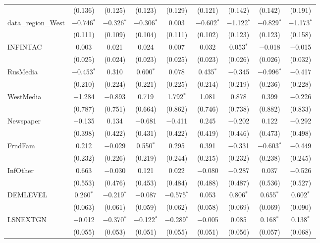 \begin{table}[!htbp]
\begin{tabular}{@{\extracolsep{1pt}}lcccccccc}
  & (0.136) & (0.125) & (0.123) & (0.129) & (0.121) & (0.142) & (0.142) & (0.191) \\ 
  data\_region\_West & $-$0.746$^{*}$ & $-$0.326$^{*}$ & $-$0.306$^{*}$ & 0.003 & $-$0.602$^{*}$ & $-$1.122$^{*}$ & $-$0.829$^{*}$ & $-$1.173$^{*}$ \\ 
  & (0.111) & (0.109) & (0.104) & (0.111) & (0.102) & (0.123) & (0.123) & (0.158) \\ 
  INFINTAC & 0.003 & 0.021 & 0.024 & 0.007 & 0.032 & 0.053$^{*}$ & $-$0.018 & $-$0.015 \\ 
  & (0.025) & (0.024) & (0.023) & (0.025) & (0.023) & (0.026) & (0.026) & (0.032) \\ 
  RusMedia & $-$0.453$^{*}$ & 0.310 & 0.600$^{*}$ & 0.078 & 0.435$^{*}$ & $-$0.345 & $-$0.996$^{*}$ & $-$0.417 \\ 
  & (0.210) & (0.224) & (0.221) & (0.225) & (0.214) & (0.219) & (0.236) & (0.228) \\ 
  WestMedia & $-$1.284 & $-$0.893 & 0.719 & 1.792$^{*}$ & 1.081 & 0.878 & 0.399 & $-$0.226 \\ 
  & (0.787) & (0.751) & (0.664) & (0.862) & (0.746) & (0.738) & (0.882) & (0.833) \\ 
  Newspaper & $-$0.135 & 0.134 & $-$0.681 & $-$0.411 & 0.245 & $-$0.202 & 0.122 & $-$0.292 \\ 
  & (0.398) & (0.422) & (0.431) & (0.422) & (0.419) & (0.446) & (0.473) & (0.498) \\ 
  FrndFam & 0.212 & $-$0.029 & 0.550$^{*}$ & 0.295 & 0.391 & $-$0.331 & $-$0.603$^{*}$ & $-$0.449 \\ 
  & (0.232) & (0.226) & (0.219) & (0.244) & (0.215) & (0.232) & (0.238) & (0.245) \\ 
  InfOther & 0.663 & $-$0.030 & 0.121 & 0.022 & $-$0.080 & $-$0.287 & 0.037 & $-$0.526 \\ 
  & (0.553) & (0.476) & (0.453) & (0.484) & (0.488) & (0.487) & (0.536) & (0.527) \\ 
  DEMLEVEL & 0.260$^{*}$ & $-$0.219$^{*}$ & $-$0.087 & $-$0.575$^{*}$ & 0.053 & 0.806$^{*}$ & 0.655$^{*}$ & 0.602$^{*}$ \\ 
  & (0.063) & (0.061) & (0.059) & (0.062) & (0.058) & (0.069) & (0.069) & (0.090) \\ 
  LSNEXTGN & $-$0.012 & $-$0.370$^{*}$ & $-$0.122$^{*}$ & $-$0.289$^{*}$ & $-$0.005 & 0.085 & 0.168$^{*}$ & 0.138$^{*}$ \\ 
  & (0.055) & (0.053) & (0.051) & (0.055) & (0.051) & (0.056) & (0.057) & (0.068) \\ 

\end{tabular}
\end{table}
